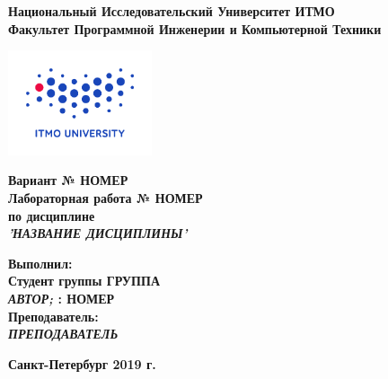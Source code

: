\documentclass[11pt]{article}
\author{АВТОР}
\date{\today}
\title{}
\begin{document}
\large
\thispagestyle{empty}
\begin{center}
\textbf{Национальный Исследовательский Университет ИТМО}\\
\textbf{Факультет Программной Инженерии и Компьютерной Техники}\\
\end{center}
\vspace{2em}
\begin{center}
\includegraphics[width=120pt]{../itmo-logo.png}
\end{center}
\LARGE
\vspace{5em}
\begin{center}
\textbf{Вариант № НОМЕР}\\
\textbf{Лабораторная работа № НОМЕР}\\
\Large
\textbf{по дисциплине}\\
\LARGE
\textbf{\emph{'НАЗВАНИЕ ДИСЦИПЛИНЫ'}}\\
\end{center}
\vspace{11em}
\large
\begin{flushright}
\textbf{Выполнил:}\\
\textbf{Студент группы ГРУППА}\\
\textbf{\emph{АВТОР;} : НОМЕР}\\
\textbf{Преподаватель:}\\
\textbf{\emph{ПРЕПОДАВАТЕЛЬ}}\\
\end{flushright}
\vspace{4em}
\large
\begin{center}
\textbf{Санкт-Петербург 2019 г.}
\end{center}
\pagebreak{}
\setcounter{tocdepth}{2}
\tableofcontents
\vspace{2em}
\end{document}
